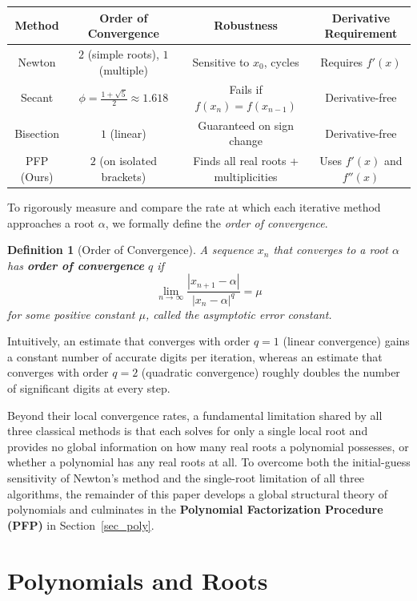 \documentclass{amsart}
\newtheorem{define}{Definition}
\begin{document}
\begin{center}
\begin{tabular}{|c|c|c|c|} \hline
\textbf{Method} & \textbf{Order of Convergence} & \textbf{Robustness} & \textbf{Derivative Requirement} \\ \hline
Newton & $2$ (simple roots), $1$ (multiple) & Sensitive to $x_0$, cycles & Requires $f'(x)$ \\ \hline 
Secant & $\phi = \frac{1+\sqrt{5}}{2} \approx 1.618$ & Fails if $f(x_n)=f(x_{n-1})$ & Derivative-free \\ \hline 
Bisection & $1$ (linear) & Guaranteed on sign change & Derivative-free \\ \hline
PFP (Ours) & $2$ (on isolated brackets) & Finds all real roots + multiplicities & Uses $f'(x)$ and $f''(x)$ \\ \hline
\end{tabular}
\end{center}

To rigorously measure and compare the rate at which each iterative method approaches a root $\alpha$, we formally define the \textit{order of convergence}.

\begin{define}[Order of Convergence]
A sequence $x_n$ that converges to a root $\alpha$ has \textbf{order of convergence} $q$ if
\[
    \lim_{n\to\infty} \frac{|x_{n+1}-\alpha|}{|x_n-\alpha|^q} = \mu
\]
for some positive constant $\mu$, called the asymptotic error constant.
\end{define}

Intuitively, an estimate that converges with order $q = 1$ (linear convergence) gains a constant number of accurate digits per iteration, whereas an estimate that converges with order $q = 2$ (quadratic convergence) roughly doubles the number of significant digits at every step.

Beyond their local convergence rates, a fundamental limitation shared by all three classical methods is that each solves for only a single local root and provides no global information on how many real roots a polynomial possesses, or whether a polynomial has any real roots at all. To overcome both the initial-guess sensitivity of Newton's method and the single-root limitation of all three algorithms, the remainder of this paper develops a global structural theory of polynomials and culminates in the \textbf{Polynomial Factorization Procedure (PFP)} in Section~\ref{sec_poly}.

\section{Polynomials and Roots}\label{sec_poly_root}
\end{document}
